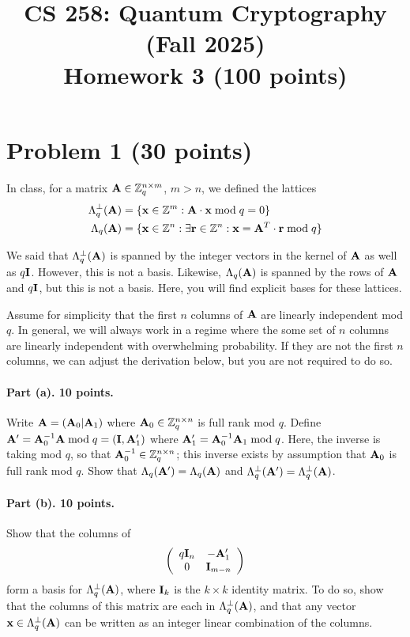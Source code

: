 \documentclass{article}
\title{CS 258: Quantum Cryptography (Fall 2025)\\ Homework 3 (100 points)}
\author{}
\date{}
\begin{document}
\maketitle

\section{Problem 1 (30 points)}

In class, for a matrix ${\mathbf{A}}\in{\mathbb{Z}}_q^{n\times m}$, $m>n$, we defined the lattices 
\begin{align*}
\Lambda_q^\perp({\mathbf{A}})&=\{{\mathbf{x}}\in{\mathbb{Z}}^m:{\mathbf{A}}\cdot{\mathbf{x}}\bmod q=0\}\\
\Lambda_q({\mathbf{A}})&=\{{\mathbf{x}}\in{\mathbb{Z}}^n:\exists{\mathbf{r}}\in{\mathbb{Z}}^n:{\mathbf{x}}={\mathbf{A}}^T\cdot{\mathbf{r}}\bmod q\}\end{align*}

We said that $\Lambda_q^\perp({\mathbf{A}})$ is spanned by the integer vectors in the kernel of ${\mathbf{A}}$ as well as $q{\mathbf{I}}$. However, this is not a basis. Likewise, $\Lambda_q({\mathbf{A}})$ is spanned by the rows of ${\mathbf{A}}$ and $q{\mathbf{I}}$, but this is not a basis. Here, you will find explicit bases for these lattices.

Assume for simplicity that the first $n$ columns of ${\mathbf{A}}$ are linearly independent mod $q$. In general, we will always work in a regime where the some set of $n$ columns are linearly independent with overwhelming probability. If they are not the first $n$ columns, we can adjust the derivation below, but you are not required to do so.

\paragraph{Part (a). 10 points.} Write ${\mathbf{A}}=({\mathbf{A}}_0|{\mathbf{A}}_1)$ where ${\mathbf{A}}_0\in{\mathbb{Z}}_q^{n\times n}$ is full rank mod $q$. Define ${\mathbf{A}}'={\mathbf{A}}_0^{-1}{\mathbf{A}}\bmod q=({\mathbf{I}},{\mathbf{A}}_1')$ where ${\mathbf{A}}_1'={\mathbf{A}}_0^{-1}{\mathbf{A}}_1\bmod q$. Here, the inverse is taking mod $q$, so that ${\mathbf{A}}_0^{-1}\in {\mathbb{Z}}_q^{n\times n}$; this inverse exists by assumption that ${\mathbf{A}}_0$ is full rank mod $q$. Show that $\Lambda_q({\mathbf{A}}')=\Lambda_q({\mathbf{A}})$ and $\Lambda_q^\perp({\mathbf{A}}')=\Lambda_q^\perp({\mathbf{A}})$.

\paragraph{Part (b). 10 points.} Show that the columns of 
\[\left(\begin{array}{cc}q{\mathbf{I}}_n&-{\mathbf{A}}_1'\\0&{\mathbf{I}}_{m-n}\end{array}\right)\]
form a basis for $\Lambda_q^\perp({\mathbf{A}})$, where ${\mathbf{I}}_k$ is the $k\times k$ identity matrix. To do so, show that the columns of this matrix are each in $\Lambda_q^\perp({\mathbf{A}})$, and that any vector ${\mathbf{x}}\in\Lambda_q^\perp({\mathbf{A}})$ can be written as an integer linear combination of the columns.
\end{document}
